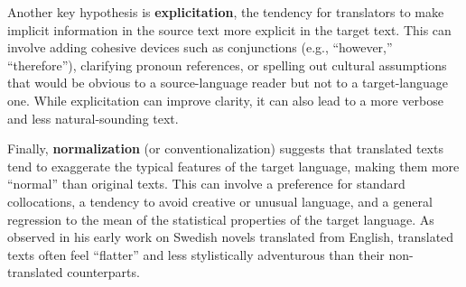 \documentclass[11pt,a4paper]{article}
\begin{document}
Another key hypothesis is \textbf{explicitation}, the tendency for translators to make implicit information in the source text more explicit in the target text. This can involve adding cohesive devices such as conjunctions (e.g., ``however,'' ``therefore''), clarifying pronoun references, or spelling out cultural assumptions that would be obvious to a source-language reader but not to a target-language one. While explicitation can improve clarity, it can also lead to a more verbose and less natural-sounding text.

Finally, \textbf{normalization} (or conventionalization) suggests that translated texts tend to exaggerate the typical features of the target language, making them more ``normal'' than original texts. This can involve a preference for standard collocations, a tendency to avoid creative or unusual language, and a general regression to the mean of the statistical properties of the target language. As \citet{gellerstam1986translationese} observed in his early work on Swedish novels translated from English, translated texts often feel ``flatter'' and less stylistically adventurous than their non-translated counterparts.
\end{document}
